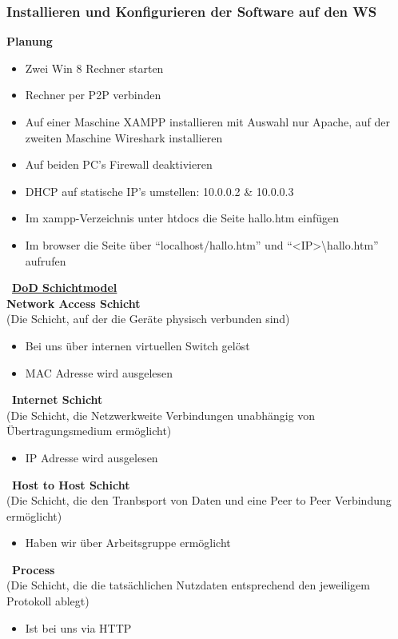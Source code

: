 \subsubsection{Installieren und Konfigurieren der Software auf den WS}
    \textbf{Planung}
    \begin{itemize}
        \item Zwei Win 8 Rechner starten
        \item Rechner per P2P verbinden
        \item Auf einer Maschine XAMPP installieren mit Auswahl nur Apache, auf der zweiten Maschine Wireshark installieren
        \item Auf beiden PC's Firewall deaktivieren
        \item DHCP auf statische IP’s umstellen: 10.0.0.2 \& 10.0.0.3
        \item Im xampp-Verzeichnis unter htdocs  die Seite hallo.htm einfügen
        \item Im browser die Seite über “localhost/hallo.htm” und “<IP>{\textbackslash}hallo.htm” aufrufen
    \end{itemize}
    \
    \underline{\textbf{DoD Schichtmodel}}\\
    \textbf{Network Access Schicht}\\
    (Die Schicht, auf der die Geräte physisch verbunden sind)
    \begin{itemize}
        \item Bei uns über internen virtuellen Switch gelöst
        \item MAC Adresse wird ausgelesen
    \end{itemize}
    \
    \textbf{Internet Schicht}
    \\
    (Die Schicht, die Netzwerkweite Verbindungen unabhängig von Übertragungsmedium ermöglicht)
    \begin{itemize}
        \item IP Adresse wird ausgelesen
    \end{itemize}
    \
    \textbf{Host to Host Schicht}
    \\
    (Die Schicht, die den Tranbsport von Daten und eine Peer to Peer Verbindung ermöglicht)
    \begin{itemize}
        \item Haben wir über Arbeitsgruppe ermöglicht
    \end{itemize}
    \
    \textbf{Process}
    \\
    (Die Schicht, die die tatsächlichen Nutzdaten entsprechend den jeweiligem Protokoll ablegt)
    \begin{itemize}
        \item Ist bei uns via HTTP
    \end{itemize}
    
